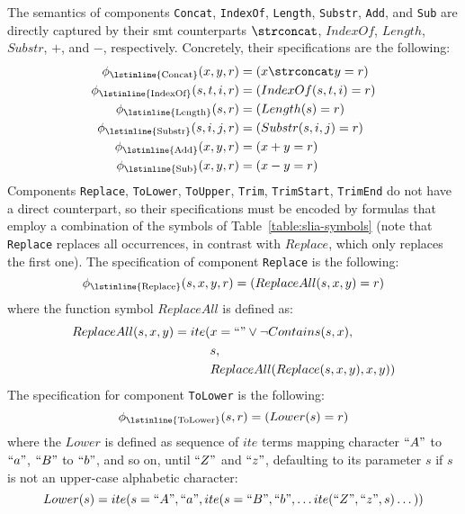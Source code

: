 \raggedbottom
%
The semantics of components \lstinline{Concat}, \lstinline{IndexOf},
\lstinline{Length}, \lstinline{Substr}, \lstinline{Add}, and \lstinline{Sub}
are directly captured by their \gls{smt} counterparts $\strconcat$, $IndexOf$,
$Length$, $Substr$, $+$, and $-$, respectively.
Concretely, their specifications are the following:
%
\begin{align*}
  \phi{}_{\text{\lstinline{Concat}}}(x, y, r)     &= (x \strconcat y   = r) \\
  \phi{}_{\text{\lstinline{IndexOf}}}(s, t, i, r) &= (IndexOf(s, t, i) = r) \\
  \phi{}_{\text{\lstinline{Length}}}(s, r)        &= (Length(s)        = r) \\
  \phi{}_{\text{\lstinline{Substr}}}(s, i, j, r)  &= (Substr(s, i, j)  = r) \\
  \phi{}_{\text{\lstinline{Add}}}(x, y, r)        &= (x + y            = r) \\
  \phi{}_{\text{\lstinline{Sub}}}(x, y, r)        &= (x - y            = r)
\end{align*}
%
\noindent
Components \lstinline{Replace}, \lstinline{ToLower}, \lstinline{ToUpper},
\lstinline{Trim}, \lstinline{TrimStart}, \lstinline{TrimEnd} do not have a
direct counterpart, so their specifications must be encoded by formulas that
employ a combination of the symbols of Table~\ref{table:slia-symbols}
(note that \lstinline{Replace} replaces all occurrences, in contrast with
$Replace$, which only replaces the first one).
The specification of component \lstinline{Replace} is the following:
%
\[
  \phi{}_{\text{\lstinline{Replace}}}(s, x, y, r) = (ReplaceAll(s, x, y) = r)
\]
%
where the function symbol $ReplaceAll$ is defined as:
\begin{align*}
  ReplaceAll(s, x, y) = ite(&x = ``" \lor{} \neg{}Contains(s, x), \\
                            &s,                                   \\
                            &ReplaceAll(Replace(s, x, y), x, y))
\end{align*}
%
The specification for component \lstinline{ToLower} is the following:
%
\[
  \phi{}_{\text{\lstinline{ToLower}}}(s, r) = (Lower(s) = r)
\]
%
where the $Lower$ is defined as sequence of $ite$ terms mapping character $``A"$
to $``a"$, $``B"$ to $``b"$, and so on, until $``Z"$ and $``z"$, defaulting to
its parameter $s$ if $s$ is not an upper-case alphabetic character:
%
\[
  Lower(s) = ite(s = ``A", ``a", ite(s = ``B", ``b", \ldots{}
  ite(``Z", ``z", s)\ldots{}))
\]
